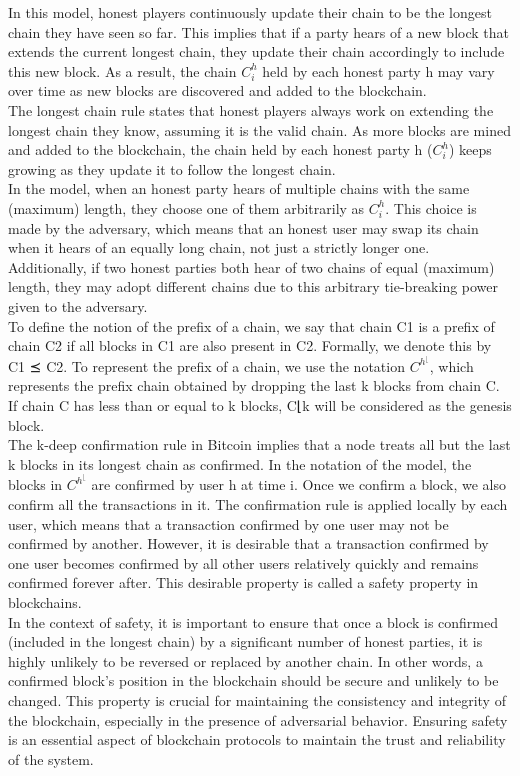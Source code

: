 \documentclass{report}
\begin{document}
In this model, honest players continuously update their chain to be the longest chain they have seen so far. This implies that if a party hears of a new block that extends the current longest chain, they update their chain accordingly to include this new block. As a result, the chain $C_{i}^{h}$ held by each honest party h may vary over time as new blocks are discovered and added to the blockchain.\\
The longest chain rule states that honest players always work on extending the longest chain they know, assuming it is the valid chain. As more blocks are mined and added to the blockchain, the chain held by each honest party h ($C_{i}^{h}$) keeps growing as they update it to follow the longest chain.\\
In the model, when an honest party hears of multiple chains with the same (maximum) length, they choose one of them arbitrarily as $C_{i}^{h}$. This choice is made by the adversary, which means that an honest user may swap its chain when it hears of an equally long chain, not just a strictly longer one. Additionally, if two honest parties both hear of two chains of equal (maximum) length, they may adopt different chains due to this arbitrary tie-breaking power given to the adversary.\\
To define the notion of the prefix of a chain, we say that chain C1 is a prefix of chain C2 if all blocks in C1 are also present in C2. Formally, we denote this by C1 ⪯ C2. To represent the prefix of a chain, we use the notation $C^{h^{⌊}}$, which represents the prefix chain obtained by dropping the last k blocks from chain C. If chain C has less than or equal to k blocks, C⌊k will be considered as the genesis block.\\
The k-deep confirmation rule in Bitcoin implies that a node treats all but the last k blocks in its longest chain as confirmed. In the notation of the model, the blocks in $C^{h^{⌊}}$ are confirmed by user h at time i. Once we confirm a block, we also confirm all the transactions in it. The confirmation rule is applied locally by each user, which means that a transaction confirmed by one user may not be confirmed by another. However, it is desirable that a transaction confirmed by one user becomes confirmed by all other users relatively quickly and remains confirmed forever after. This desirable property is called a safety property in blockchains.\\
In the context of safety, it is important to ensure that once a block is confirmed (included in the longest chain) by a significant number of honest parties, it is highly unlikely to be reversed or replaced by another chain. In other words, a confirmed block's position in the blockchain should be secure and unlikely to be changed. This property is crucial for maintaining the consistency and integrity of the blockchain, especially in the presence of adversarial behavior. Ensuring safety is an essential aspect of blockchain protocols to maintain the trust and reliability of the system.
\end{document}
